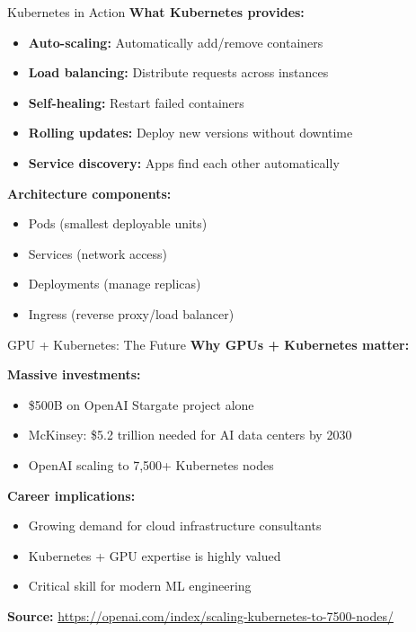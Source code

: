 \documentclass[../main.tex]{subfiles}
\begin{document}
\begin{frame}{Kubernetes in Action}
    \textbf{What Kubernetes provides:}
    \begin{itemize}
        \item \textbf{Auto-scaling:} Automatically add/remove containers
        \item \textbf{Load balancing:} Distribute requests across instances
        \item \textbf{Self-healing:} Restart failed containers
        \item \textbf{Rolling updates:} Deploy new versions without downtime
        \item \textbf{Service discovery:} Apps find each other automatically
    \end{itemize}

    \bigskip

    \textbf{Architecture components:}
    \begin{itemize}
        \item Pods (smallest deployable units)
        \item Services (network access)
        \item Deployments (manage replicas)
        \item Ingress (reverse proxy/load balancer)
    \end{itemize}
\end{frame}

\begin{frame}{GPU + Kubernetes: The Future}
    \textbf{Why GPUs + Kubernetes matter:}

    \bigskip

    \textbf{Massive investments:}
    \begin{itemize}
        \item \$500B on OpenAI Stargate project alone
        \item McKinsey: \$5.2 trillion needed for AI data centers by 2030
        \item OpenAI scaling to 7,500+ Kubernetes nodes
    \end{itemize}

    \bigskip

    \textbf{Career implications:}
    \begin{itemize}
        \item Growing demand for cloud infrastructure consultants
        \item Kubernetes + GPU expertise is highly valued
        \item Critical skill for modern ML engineering
    \end{itemize}

    \bigskip

    \textbf{Source:} \url{https://openai.com/index/scaling-kubernetes-to-7500-nodes/}
\end{frame}
\end{document}
